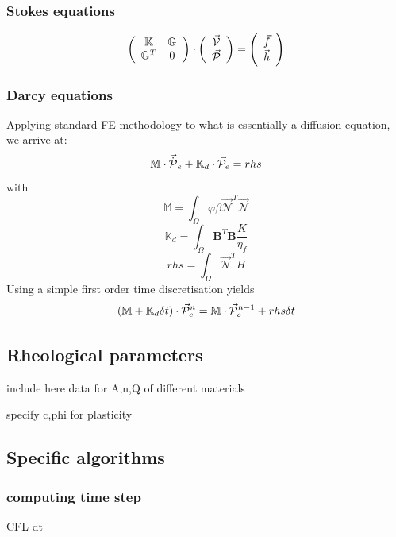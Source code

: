 \documentclass[a4paper]{article}
\newcommand{\K}{{\mathbb{K}}}
\newcommand{\G}{{\mathbb{G}}}
\newcommand{\M}{{\mathbb{M}}}
\newcommand{\bN}{{\mathcal{N}}}
\begin{document}
\subsubsection{Stokes equations}

\[
\left(
\begin{array}{cc}
\K & \G \\
\G^T & 0 
\end{array}
\right)
\cdot
\left(
\begin{array}{c}
\vec{\cal V} \\ 
\vec{\cal P}
\end{array}
\right)
=
\left(
\begin{array}{c}
\vec{f} \\ 
\vec{h}
\end{array}
\right)
\]


\subsubsection{Darcy equations}
Applying standard FE methodology to what is essentially a diffusion equation, we arrive at:
\[
{\M} \cdot {\vec{\dot{\cal{P}}}}_e  + {\K}_d \cdot \vec{\cal P}_e = rhs
\]
with
\[
{\M} = \int_\Omega \varphi \beta \vec{\bN}^T \vec{\bN} 
\]
\[
\K_d = \int_\Omega {\bm B}^T {\bm B} \frac{K}{\eta_f} 
\]
\[
rhs = \int_\Omega \vec\bN^T  H 
\]
Using a simple first order time discretisation yields
\[
({\M} + {\K}_d \delta t) \cdot \vec{\cal P}_e^n = \M \cdot \vec{\cal P}_e^{n-1} + rhs \delta t
\]


\subsection{Rheological parameters}

include here data for A,n,Q of different materials

specify c,phi for plasticity



\subsection{Specific algorithms}

\subsubsection{computing time step}

CFL dt
\end{document}
